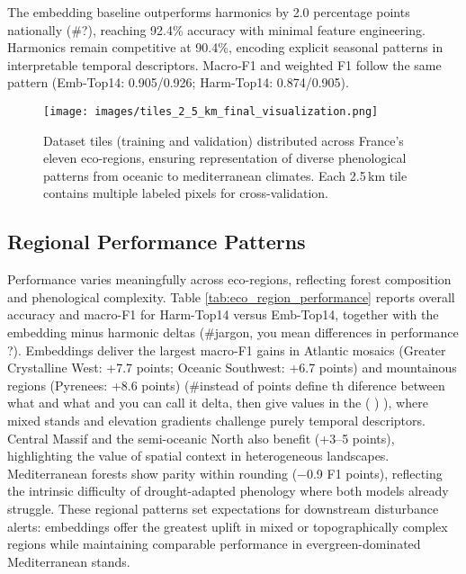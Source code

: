 \documentclass[utf8]{FrontiersinHarvard}
\begin{document}
The embedding baseline outperforms harmonics by 2.0 percentage points nationally (#?), reaching 92.4\% accuracy with minimal feature engineering. Harmonics remain competitive at 90.4\%, encoding explicit seasonal patterns in interpretable temporal descriptors. Macro‑F1 and weighted F1 follow the same pattern (Emb‑Top14: 0.905/0.926; Harm‑Top14: 0.874/0.905).

\begin{figure}[H]
    \centering
    \texttt{[image: images/tiles\_2\_5\_km\_final\_visualization.png]}
    \caption{Dataset tiles (training and validation) distributed across France's eleven eco-regions, ensuring representation of diverse phenological patterns from oceanic to mediterranean climates. Each 2.5\,km tile contains multiple labeled pixels for cross-validation.}
    \label{fig:training_tiles}
\end{figure}

\subsection{Regional Performance Patterns}

Performance varies meaningfully across eco-regions, reflecting forest composition and phenological complexity. Table \ref{tab:eco_region_performance} reports overall accuracy and macro-F1 for Harm-Top14 versus Emb-Top14, together with the embedding minus harmonic deltas (#jargon, you mean differences in performance ?). Embeddings deliver the largest macro-F1 gains in Atlantic mosaics (Greater Crystalline West: +7.7 points; Oceanic Southwest: +6.7 points) and mountainous regions (Pyrenees: +8.6 points) (#instead of points define th diference between what and what and you can call it delta, then give values in the ( ) ), where mixed stands and elevation gradients challenge purely temporal descriptors. Central Massif and the semi-oceanic North also benefit (+3–5 points), highlighting the value of spatial context in heterogeneous landscapes. Mediterranean forests show parity within rounding (−0.9 F1 points), reflecting the intrinsic difficulty of drought-adapted phenology where both models already struggle. These regional patterns set expectations for downstream disturbance alerts: embeddings offer the greatest uplift in mixed or topographically complex regions while maintaining comparable performance in evergreen-dominated Mediterranean stands.
\end{document}
